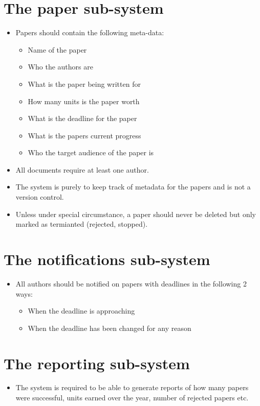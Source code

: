 \documentclass[a4paper]{article}
\begin{document}
\section{The paper sub-system}
	\begin{itemize}
		\item Papers should contain the following meta-data:
		\begin{itemize}
			\item Name of the paper
			\item Who the authors are
            \item What is the paper being written for
            \item How many units is the paper worth
            \item What is the deadline for the paper
            \item What is the papers current progress
            \item Who the target audience of the paper is
		\end{itemize}
        \item All documents require at least one author.
        \item The system is purely to keep track of metadata for the papers and is not a version control.
        \item Unless under special circumstance, a paper should never be deleted but only marked as termianted (rejected, stopped).
	\end{itemize}
    
\section{The notifications sub-system}
	\begin{itemize}
		\item All authors should be notified on papers with deadlines in the following 2 ways:
		\begin{itemize}
			\item When the deadline is approaching
			\item When the deadline has been changed for any reason
		\end{itemize}
	\end{itemize}
    
\section{The reporting sub-system}
	\begin{itemize}
		\item The system is required to be able to generate reports of how many papers were successful, units earned over the year, 			number of rejected papers etc.
	\end{itemize}
    
\end{document}
